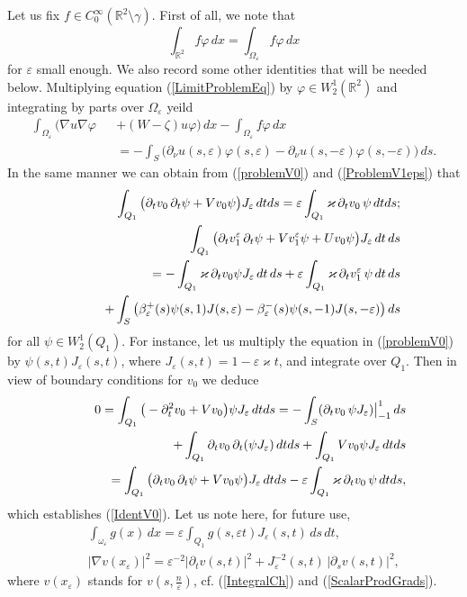 \documentclass[graybox]{svmult}
\renewcommand{\kappa}{\varkappa}
\newcommand{\Real}{\mathbb R}
\newcommand{\eps}{\varepsilon}
\renewcommand{\phi}{\varphi}
\newcommand\nep{\textstyle\frac n\eps}
\newcommand{\eqref}[1]{(\ref{#1})}
\begin{document}
Let us fix $f\in C_0^\infty(\Real^2\setminus\gamma)$.
First of all, we note that
\begin{equation}\label{IntR2=IntOmEps}
  \int_{\Real^2}f\phi\,dx=\int_{\Omega_\eps}f\phi\,dx
\end{equation}
for $\eps$ small enough.
We also record some other identities that will be needed below.
Multiplying equation \eqref{LimitProblemEq} by $\phi\in W_2^1(\Real^2)$ and integrating by parts over $\Omega_\eps$ yeild
\begin{eqnarray}\nonumber
\int_{\Omega_\eps}\big(\nabla u \nabla \phi&&+(W-\zeta)u\phi \big)\,dx-\int_{\Omega_\eps}f\phi\,dx\\\label{IdentU}
&&=-\int_S \big(\partial_\nu u(s,\eps)\phi(s,\eps)-\partial_\nu u(s,-\eps)\phi(s,-\eps) \big)\,ds.
\end{eqnarray}
In the same manner we can obtain from \eqref{problemV0} and \eqref{ProblemV1eps} that
\begin{eqnarray}\label{IdentV0}
&&\int_{Q_1}\big(\partial_t v_0 \,\partial_t \psi
+Vv_0 \psi\big)J_\eps\,dt ds
=\eps \int_{Q_1} \kappa\,\partial_t v_0\, \psi \,dt ds;
\\\nonumber
&&\int_{Q_1}\big(\partial_t v_1^\eps \,\partial_t \psi
+Vv_1^\eps \psi+Uv_0\psi\big)J_\eps\,dt\, ds
\\\label{IdentV1}
&&\kern20pt=
-\int_{Q_1}\kappa \,\partial_t v_0\psi J_\eps\,dt\, ds+\eps\int_{Q_1}\kappa \,\partial_t v_1^\eps\, \psi\,dt\, ds\\\nonumber
&&\kern20pt+\int_S\left(\beta_\eps^+(s)\psi(s,1)J(s,\eps)
-\beta_\eps^-(s)\psi(s,-1)J(s,-\eps)\right)ds
\end{eqnarray}
for all $\psi\in W_2^1(Q_1)$.
For instance, let us multiply the equation in \eqref{problemV0} by $\psi(s,t)J_\eps(s,t)$, where $J_\eps(s,t)=1-\eps\kappa t$, and integrate over $Q_1$. Then in view of boundary conditions for $v_0$ we deduce
\begin{eqnarray}\nonumber
  &&0=\int_{Q_1}\big(-\partial_t^2 v_0+Vv_0\big) \psi J_\eps\,dt ds=-\int_S (\partial_t v_0 \,\psi J_\eps)\big|_{-1}^1\,ds\\\nonumber
&&\kern30pt+
\int_{Q_1}\partial_t v_0 \,\partial_t (\psi J_\eps)\,dt ds
+\int_{Q_1}Vv_0 \psi J_\eps\,dt ds\\\nonumber
&&\kern30pt=\int_{Q_1}\big(\partial_t v_0 \,\partial_t \psi
+Vv_0 \psi\big)J_\eps\,dt ds
-\eps \int_{Q_1} \kappa\,\partial_t v_0\, \psi \,dt ds,
\end{eqnarray}
which establishes \eqref{IdentV0}.
Let us note here, for future use,
\begin{eqnarray}\label{IntXtoIntST}
&& \int_{\omega_\eps} g(x)\,dx=\eps \int_{Q_1} g(s,\eps t)J_\eps(s,t)\,ds\,dt,\\\label{LocalGrad}
&&
|\nabla v(x_\eps)|^2=\eps^{-2}|\partial_t v(s,t)|^2+J^{-2}_\eps(s,t)\,|\partial_s v(s,t)|^2,
\end{eqnarray}
where $v(x_\eps)$ stands for $v(s,\nep)$, cf. \eqref{IntegralCh} and \eqref{ScalarProdGrads}.
\end{document}
